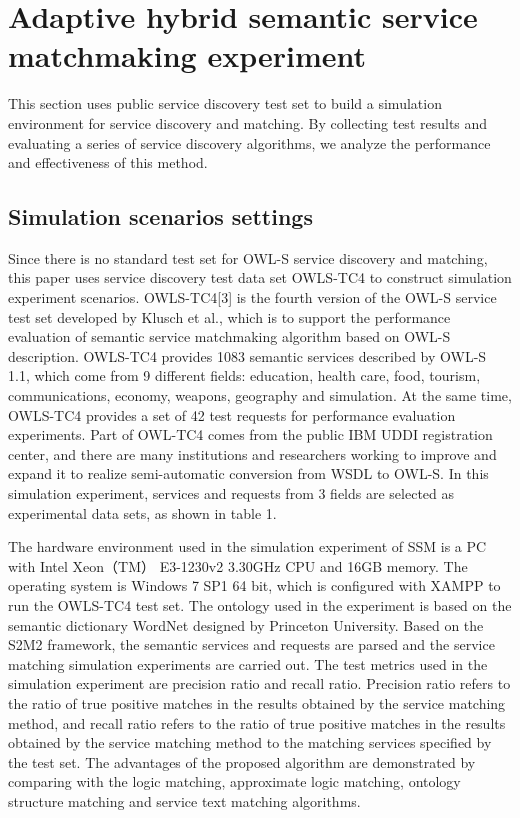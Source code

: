 \documentclass{ieeeaccess}
\begin{document}
\section{Adaptive hybrid semantic service matchmaking experiment}
This section uses public service discovery test set to build a simulation environment for service discovery and matching. By collecting test results and evaluating a series of service discovery algorithms, we analyze the performance and effectiveness of this method.

\subsection{Simulation scenarios settings}
Since there is no standard test set for OWL-S service discovery and matching, this paper uses service discovery test data set OWLS-TC4 to construct simulation experiment scenarios. OWLS-TC4[3] is the fourth version of the OWL-S service test set developed by Klusch et al., which is to support the performance evaluation of semantic service matchmaking algorithm based on OWL-S description. OWLS-TC4 provides 1083 semantic services described by OWL-S 1.1, which come from 9 different fields: education, health care, food, tourism, communications, economy, weapons, geography and simulation. At the same time, OWLS-TC4 provides a set of 42 test requests for performance evaluation experiments. Part of OWL-TC4 comes from the public IBM UDDI registration center, and there are many institutions and researchers working to improve and expand it to realize semi-automatic conversion from WSDL to OWL-S. In this simulation experiment, services and requests from 3 fields are selected as experimental data sets, as shown in table 1.

The hardware environment used in the simulation experiment of SSM is a PC with Intel Xeon（TM） E3-1230v2 3.30GHz CPU and 16GB memory. The operating system is Windows 7 SP1 64 bit, which is configured with XAMPP to run the OWLS-TC4 test set. The ontology used in the experiment is based on the semantic dictionary WordNet designed by Princeton University. Based on the S2M2 framework, the semantic services and requests are parsed and the service matching simulation experiments are carried out.
The test metrics used in the simulation experiment are precision ratio and recall ratio. Precision ratio refers to the ratio of true positive matches in the results obtained by the service matching method, and recall ratio refers to the ratio of true positive matches in the results obtained by the service matching method to the matching services specified by the test set. The advantages of the proposed algorithm are demonstrated by comparing with the logic matching, approximate logic matching, ontology structure matching and service text matching algorithms.
\end{document}
